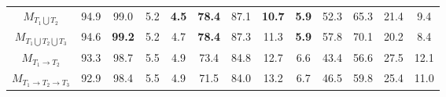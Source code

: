 \begin{table}[t]
{\begin{adjustbox}{width=1.3\textwidth,center}
\begin{tabular}{|c|cccc|cccc|cccc|}
            \textbf{$M_{T_1 \bigcup T_2}$}                   & 94.9                   & 99.0                   & 5.2                   & \textbf{4.5}           & \textbf{78.4}          & 87.1                   & \textbf{10.7}         & \textbf{5.9}           & 52.3                   & 65.3                   & 21.4                  & 9.4                     \\
            \textbf{$M_{T_1 \bigcup T_2 \bigcup T_3}$}         & 94.6                   & \textbf{99.2}          & 5.2                   & 4.7                    & \textbf{78.4}          & 87.3                   & 11.3                  & \textbf{5.9}           & 57.8                   & 70.1                   & 20.2                  & 8.4                     \\
            \textbf{$M_{T_1 \rightarrow T_2}$}               & 93.3                   & 98.7                   & 5.5                   & 4.9                    & 73.4                   & 84.8                   & 12.7                  & 6.6                    & 43.4                   & 56.6                   & 27.5                  & 12.1                    \\
            \textbf{$M_{T_1 \rightarrow T_2 \rightarrow T_3}$} & 92.9                   & 98.4                   & 5.5                   & 4.9                    & 71.5                   & 84.0                   & 13.2                  & 6.7                    & 46.5                   & 59.8                   & 25.4                  & 11.0                    \\ \hline
            \end{tabular}
        \end{adjustbox}
    }


\end{table}
